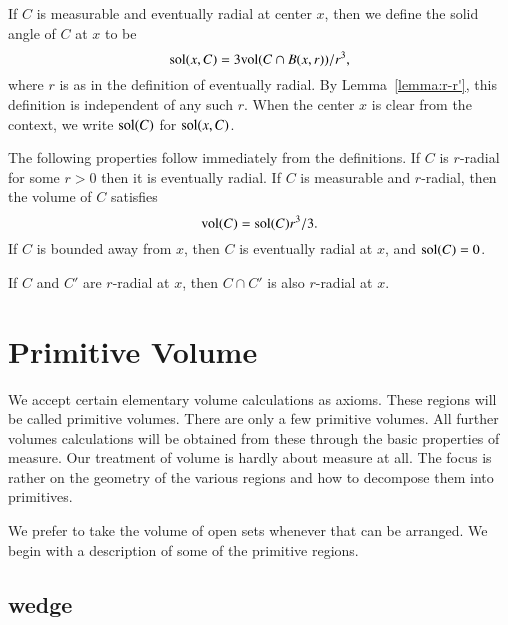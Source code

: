 \begin{definition}
If $C$ is measurable and eventually radial at center $x$, then we
define the solid angle of $C$ at $x$ to be
    $$
    {\operatorname{sol}}(x,C) = 3 {\operatorname{vol}}(C\cap B(x,r))/r^3,
    $$
where $r$ is as in the definition of eventually radial. 
By Lemma~\ref{lemma:r-r'}, this
definition is independent of any such $r$.  When the center $x$ is
clear from the context, we write ${\operatorname{sol}}(C)$ for
${\operatorname{sol}}(x,C)$.
\end{definition}



The following properties follow immediately from the definitions.
If $C$ is $r$-radial for some $r>0$ then it is eventually radial.
If $C$ is measurable and $r$-radial, then the volume of $C$
satisfies
    $$
    {\operatorname{vol}}(C) = {\operatorname{sol}}(C) r^3/3.
    $$
If $C$ is bounded away from $x$, then $C$ is eventually radial at
$x$, and ${\operatorname{sol}}(C) = 0$.

\begin{lemma}  If $C$ and $C'$ are  $r$-radial
at $x$, then $C\cap C'$ is also $r$-radial at
$x$.
\end{lemma}






\section{Primitive Volume}

We accept 
certain elementary volume calculations as axioms.  
These regions will be called primitive volumes.  There are only
a few primitive volumes.
All further
volumes calculations will be obtained from these through the basic
properties of measure.   
Our treatment of volume 
is hardly about measure at all.  The focus is rather on
the geometry of the various regions and how to decompose them into
primitives.

We prefer to take the volume of open sets whenever that can be
arranged.  We begin with a description of some of the primitive
regions.









\subsection{wedge}


